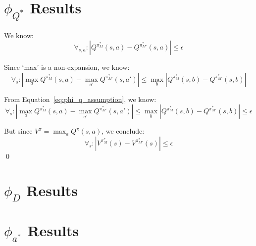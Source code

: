 \documentclass[11pt]{amsart}
\begin{document}
\newpage
\section{$\phi_{Q^*}$ Results}

We know:
\begin{equation}
\forall_{s,a} : | Q^{\pi^*_M}(s,a) - Q^{\pi^*_{M'}}(s,a)| \leq \epsilon
\label{eq:phi_q_assumption}
\end{equation}

Since `max' is a non-expansion, we know:
\begin{equation}
\forall_s : |\max_a Q^{\pi^*_M}(s,a) - \max_{a'} Q^{\pi^*_{M'}}(s,a')| \leq \max_b | Q^{\pi^*_M}(s,b) - Q^{\pi^*_{M'}}(s,b)|
\end{equation}

From Equation~\ref{eq:phi_q_assumption}, we know:
\begin{equation}
\forall_s : |\max_a Q^{\pi^*_M}(s,a) - \max_{a'} Q^{\pi^*_{M'}}(s,a')| \leq \max_b | Q^{\pi^*_M}(s,b) - Q^{\pi^*_{M'}}(s,b)| \leq \epsilon
\end{equation}

But since $V^{\pi} = \max_a Q^\pi(s,a)$, we conclude:
\begin{equation}
\forall_s : |V^{\pi^*_M}(s) - V^{\pi^*_{M'}}(s)| \leq \epsilon
\end{equation}
\qed

\newpage
\section{$\phi_{D}$ Results}

\newpage
\section{$\phi_{a^*}$ Results}



\newpage

\end{document}

